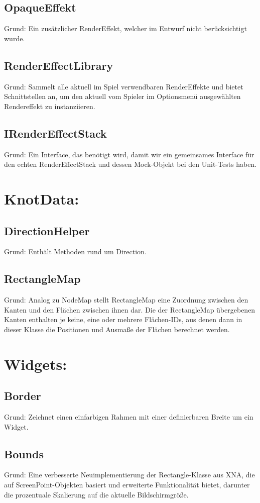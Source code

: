 \subsection{OpaqueEffekt}
Grund: Ein zusätzlicher RenderEffekt, welcher im Entwurf nicht berücksichtigt wurde.
\subsection{RenderEffectLibrary}
Grund: Sammelt alle aktuell im Spiel verwendbaren RenderEffekte und bietet Schnittstellen an, um den aktuell vom Spieler im Optionsmenü ausgewählten Rendereffekt zu instanziieren.
\subsection{IRenderEffectStack}
Grund: Ein Interface, das benötigt wird, damit wir ein gemeinsames Interface für den echten RenderEffectStack und dessen Mock-Objekt bei den Unit-Tests haben.

\section{KnotData:}
\subsection{DirectionHelper}
Grund: Enthält Methoden rund um Direction.
\subsection{RectangleMap}
Grund: Analog zu NodeMap stellt RectangleMap eine Zuordnung zwischen den Kanten und den Flächen zwischen ihnen dar. Die der RectangleMap übergebenen Kanten enthalten je keine, eine oder mehrere Flächen-IDs, aus denen dann in dieser Klasse die Positionen und Ausmaße der Flächen berechnet werden. 

\section{Widgets:}
\subsection{Border}
Grund: Zeichnet einen einfarbigen Rahmen mit einer definierbaren Breite um ein Widget.
\subsection{Bounds}
Grund: Eine verbesserte Neuimplementierung der Rectangle-Klasse aus XNA, die auf ScreenPoint-Objekten basiert und erweiterte Funktionalität bietet, darunter die prozentuale Skalierung auf die aktuelle Bildschirmgröße.
